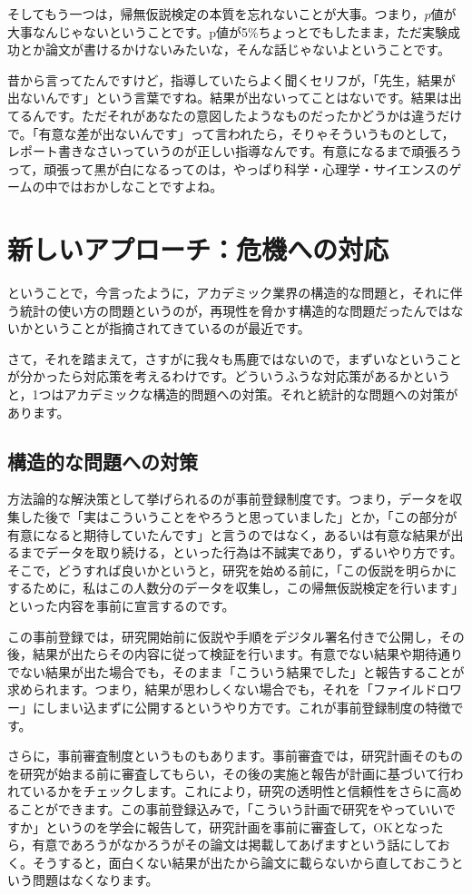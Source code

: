 \documentclass{ltjsbook}
\begin{document}
そしてもう一つは，帰無仮説検定の本質を忘れないことが大事。つまり，$p$値が大事なんじゃないということです。p値が5\%ちょっとでもしたまま，ただ実験成功とか論文が書けるかけないみたいな，そんな話じゃないよということです。

昔から言ってたんですけど，指導していたらよく聞くセリフが，「先生，結果が出ないんです」という言葉ですね。結果が出ないってことはないです。結果は出てるんです。ただそれがあなたの意図したようなものだったかどうかは違うだけで。「有意な差が出ないんです」って言われたら，そりゃそういうものとして，レポート書きなさいっていうのが正しい指導なんです。有意になるまで頑張ろうって，頑張って黒が白になるってのは，やっぱり科学・心理学・サイエンスのゲームの中ではおかしなことですよね。

\section{新しいアプローチ：危機への対応}
ということで，今言ったように，アカデミック業界の構造的な問題と，それに伴う統計の使い方の問題というのが，再現性を脅かす構造的な問題だったんではないかということが指摘されてきているのが最近です。

さて，それを踏まえて，さすがに我々も馬鹿ではないので，まずいなということが分かったら対応策を考えるわけです。どういうふうな対応策があるかというと，1つはアカデミックな構造的問題への対策。それと統計的な問題への対策があります。
\subsection{構造的な問題への対策}
方法論的な解決策として挙げられるのが事前登録制度です。つまり，データを収集した後で「実はこういうことをやろうと思っていました」とか，「この部分が有意になると期待していたんです」と言うのではなく，あるいは有意な結果が出るまでデータを取り続ける，といった行為は不誠実であり，ずるいやり方です。そこで，どうすれば良いかというと，研究を始める前に，「この仮説を明らかにするために，私はこの人数分のデータを収集し，この帰無仮説検定を行います」といった内容を事前に宣言するのです。

この事前登録では，研究開始前に仮説や手順をデジタル署名付きで公開し，その後，結果が出たらその内容に従って検証を行います。有意でない結果や期待通りでない結果が出た場合でも，そのまま「こういう結果でした」と報告することが求められます。つまり，結果が思わしくない場合でも，それを「ファイルドロワー」にしまい込まずに公開するというやり方です。これが事前登録制度の特徴です。

さらに，事前審査制度というものもあります。事前審査では，研究計画そのものを研究が始まる前に審査してもらい，その後の実施と報告が計画に基づいて行われているかをチェックします。これにより，研究の透明性と信頼性をさらに高めることができます。この事前登録込みで，「こういう計画で研究をやっていいですか」というのを学会に報告して，研究計画を事前に審査して，OKとなったら，有意であろうがなかろうがその論文は掲載してあげますという話にしておく。そうすると，面白くない結果が出たから論文に載らないから直しておこうという問題はなくなります。
\end{document}
